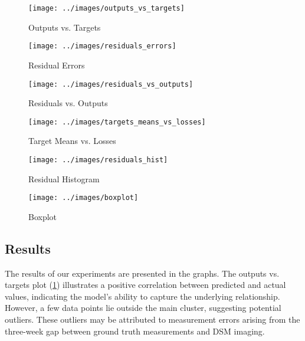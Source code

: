 \begin{figure*}
    \begin{subfigure}{0.66\columnwidth}
        \texttt{[image: ../images/outputs\_vs\_targets]}
        \caption{Outputs vs. Targets}
        \label{fig:outputs_vs_targets}
    \end{subfigure}
    \hfill
    \begin{subfigure}{0.66\columnwidth}
        \texttt{[image: ../images/residuals\_errors]}
        \caption{Residual Errors}
        \label{fig:residuals_errors}
    \end{subfigure}
    \hfill
    \begin{subfigure}{0.66\columnwidth}
        \texttt{[image: ../images/residuals\_vs\_outputs]}
        \caption{Residuals vs. Outputs}
        \label{fig:residuals_vs_outputs}
    \end{subfigure}
    \hfill
    \begin{subfigure}{0.66\columnwidth}
        \texttt{[image: ../images/targets\_means\_vs\_losses]}
        \caption{Target Means vs. Losses}
        \label{fig:targets_means_vs_losses}
    \end{subfigure}
    \hfill
    \begin{subfigure}{0.66\columnwidth}
        \texttt{[image: ../images/residuals\_hist]}
        \caption{Residual Histogram}
        \label{fig:residuals_hist}
    \end{subfigure}
    \hfill
    \begin{subfigure}{0.66\columnwidth}
        \texttt{[image: ../images/boxplot]}
        \caption{Boxplot}
        \label{fig:boxplot}
    \end{subfigure}
    \hfill
\end{figure*}

\subsection{Results}
\label{sec:results}

The results of our experiments are presented in the graphs. The outputs vs. targets plot (\ref{fig:outputs_vs_targets}) illustrates a positive correlation between predicted and actual values, indicating the model's ability to capture the underlying relationship. However, a few data points lie outside the main cluster, suggesting potential outliers. These outliers may be attributed to measurement errors arising from the three-week gap between ground truth measurements and DSM imaging.

